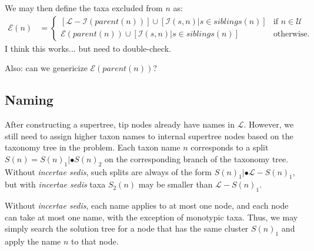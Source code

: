 \documentclass[english]{article}
\begin{document}
We may then define the taxa excluded from $n$ as:
\begin{align*}
\mathcal{E}(n) & =\begin{cases}
\left[\mathcal{L}-\mathcal{I}(parent(n))\right]\cup[\mathcal{I}(s,n)|s\in siblings(n)] & \text{if }n\in\mathcal{U}\\
\mathcal{E}(parent(n))\cup[\mathcal{I}(s,n)|s\in siblings(n)] & \text{otherwise.}
\end{cases}
\end{align*}
I think this works... but
need to double-check.

Also: can we genericize $\mathcal{E}(parent(n))$?

\subsection{Naming }

After constructing a supertree, tip nodes already have names in
\emph{$\mathcal{L}$}. However, we still need to assign higher taxon
names to internal supertree nodes based on the taxonomy tree in the
problem. Each taxon name $n$ corresponds to a split
$S(n)=S(n)_{1}|\bullet S(n)_{2}$ on the corresponding branch of the
taxonomy tree. Without \emph{incertae sedis}, such splits are always
of the form $S(n)_{1}|\bullet\mathcal{L}-S(n)_{1}$, but with
\emph{incertae sedis} taxa $S_{2}(n)$ may be smaller than
$\mathcal{L}-S(n)_{1}$.

Without \emph{incertae sedis}, each name applies to at most one node,
and each node can take at most one name, with the exception of
monotypic taxa. Thus, we may simply search the solution tree for a
node that has the same cluster $S(n)_{1}$ and apply the name $n$ to
that node.
\end{document}
